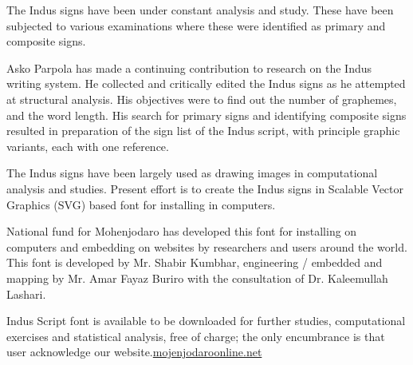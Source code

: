 The Indus signs have been under constant analysis and study. These have been subjected to various examinations where these were identified as primary and composite signs.

Asko Parpola has made a continuing contribution to research on the Indus writing system. He collected and critically edited the Indus signs as he attempted at structural analysis. His objectives were to find out the number of graphemes, and the word length. His search for primary signs and identifying composite signs resulted in preparation of the sign list of the Indus script, with principle graphic variants, each with one reference.

The Indus signs have been largely used as drawing images in computational analysis and studies. Present effort is to create the Indus signs in Scalable Vector Graphics (SVG) based font for installing in computers.

National fund for Mohenjodaro has developed this font for installing on computers and embedding on websites by researchers and users around the world. This font is developed by Mr. Shabir Kumbhar, engineering / embedded and mapping by Mr. Amar Fayaz Buriro with the consultation of Dr. Kaleemullah Lashari.

Indus Script font is available to be downloaded for further studies, computational exercises and statistical analysis, free of charge; the only encumbrance is that user acknowledge our website.\href{https://www.mohenjodaroonline.net/index.php/indus-script}{mojenjodaroonline.net}